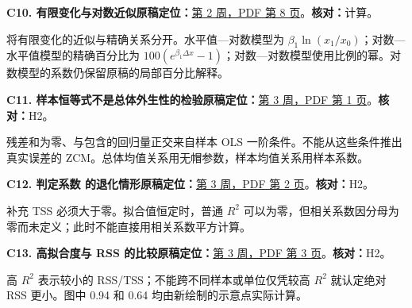 \par\medskip\noindent\begin{minipage}{\linewidth}

\label{err:logs}

\textbf{C10. 有限变化与对数近似}\quad\textbf{原稿定位：}\hyperref[src:w2p8]{第 2 周，PDF 第 8 页}。\quad\textbf{核对：}计算。\par

将有限变化的近似与精确关系分开。水平值—对数模型为 $\beta_1\ln(x_1/x_0)$；对数—水平值模型的精确百分比为 $100(e^{\beta_1\Delta x}-1)$；对数—对数模型使用比例的幂。对数模型的系数仍保留原稿的局部百分比解释。

\end{minipage}\par

\par\medskip\noindent\begin{minipage}{\linewidth}

\label{err:sample-population}

\textbf{C11. 样本恒等式不是总体外生性的检验}\quad\textbf{原稿定位：}\hyperref[src:w3p1]{第 3 周，PDF 第 1 页}。\quad\textbf{核对：}H2。\par

残差和为零、与包含的回归量正交来自样本 OLS 一阶条件。不能从这些条件推出真实误差的 ZCM。总体均值关系用无帽参数，样本均值关系用样本系数。

\end{minipage}\par

\par\medskip\noindent\begin{minipage}{\linewidth}

\label{err:r2-degenerate}

\textbf{C12. 判定系数 的退化情形}\quad\textbf{原稿定位：}\hyperref[src:w3p2]{第 3 周，PDF 第 2 页}。\quad\textbf{核对：}H2。\par

补充 TSS 必须大于零。拟合值恒定时，普通 $R^2$ 可以为零，但相关系数因分母为零而未定义；此时不能直接用相关系数平方计算。

\end{minipage}\par

\par\medskip\noindent\begin{minipage}{\linewidth}

\label{err:r2-rss}

\textbf{C13. 高拟合度与 RSS 的比较}\quad\textbf{原稿定位：}\hyperref[src:w3p3]{第 3 周，PDF 第 3 页}。\quad\textbf{核对：}H2。\par

高 $R^2$ 表示较小的 RSS/TSS；不能跨不同样本或单位仅凭较高 $R^2$ 就认定绝对 RSS 更小。图中 0.94 和 0.64 均由新绘制的示意点实际计算。

\end{minipage}\par

